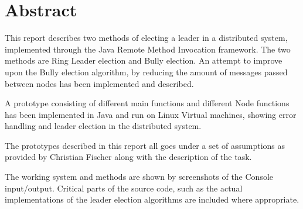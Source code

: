 \chapter*{Abstract}
This report describes two methods of electing a leader in a distributed system, implemented through the Java Remote Method Invocation framework. The two methods are Ring Leader election and Bully election. An attempt to improve upon the Bully election algorithm, by reducing the amount of messages passed between nodes has been implemented and described. 

A prototype consisting of different main functions and different Node functions has been implemented in Java and run on Linux Virtual machines, showing error handling and leader election in the distributed system.

The prototypes described in this report all goes under a set of assumptions as provided by Christian Fischer along with the description of the task. 

The working system and methods are shown by screenshots of the Console input/output. Critical parts of the source code, such as the actual implementations of the leader election algorithms are included where appropriate. 

\setcounter{tocdepth}{1}
\tableofcontents